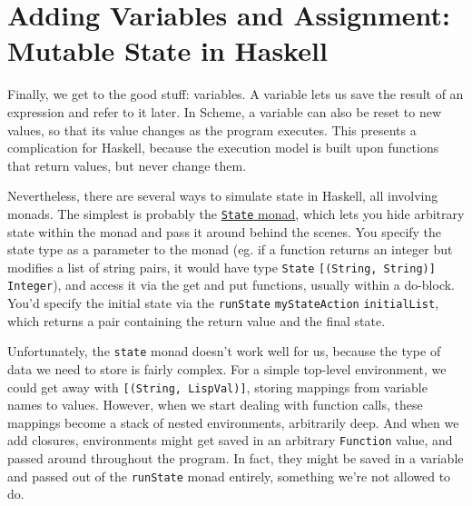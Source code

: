\chapter[Adding Variables and Assignment]{Adding Variables and Assignment: Mutable State in Haskell}
 
 
Finally, we get to the good stuff: variables. A variable lets us save the result of an expression and refer to it later. In Scheme, a variable can also be reset to new values, so that its value changes as the program executes. This presents a complication for Haskell, because the execution model is built upon functions that return values, but never change them.
 
Nevertheless, there are several ways to simulate state in Haskell, all involving monads. The simplest is probably the \href{http://www.haskell.org/ghc/docs/latest/html/libraries/mtl/Control-Monad-State.html}{\texttt{State} monad}, which lets you hide arbitrary state within the monad and pass it around behind the scenes. You specify the state type as a parameter to the monad (eg. if a function returns an integer but modifies a list of string pairs, it would have type \lstinline|State| \lstinline|[(String, String)]| \lstinline|Integer|), and access it via the get and put functions, usually within a do-block. You'd specify the initial state via the \verb|runState| \verb|myStateAction| \verb|initialList|, which returns a pair containing the return value and the final state.
 
Unfortunately, the \verb|state| monad doesn't work well for us, because the type of data we need to store is fairly complex. For a simple top-level environment, we could get away with \lstinline|[(String, LispVal)]|, storing mappings from variable names to values. However, when we start dealing with function calls, these mappings become a stack of nested environments, arbitrarily deep. And when we add closures, environments might get saved in an arbitrary \verb|Function| value, and passed around throughout the program. In fact, they might be saved in a variable and passed out of the \verb|runState| monad entirely, something we're not allowed to do.
 
